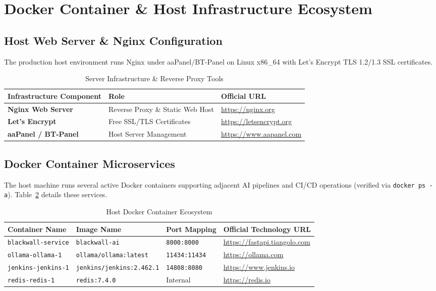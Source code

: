 \documentclass[11pt, a4paper]{article}
\begin{document}
\section{Docker Container \& Host Infrastructure Ecosystem}

\subsection{Host Web Server \& Nginx Configuration}
The production host environment runs Nginx under aaPanel/BT-Panel on Linux x86\_64 with Let's Encrypt TLS 1.2/1.3 SSL certificates.

\begin{table}[H]
\centering
\caption{Server Infrastructure \& Reverse Proxy Tools}
\label{tab:tools_ch7_infra}
\begin{tabularx}{\textwidth}{l l X}
\toprule
\textbf{Infrastructure Component} & \textbf{Role} & \textbf{Official URL} \\
\midrule
\textbf{Nginx Web Server} & Reverse Proxy \& Static Web Host & \url{https://nginx.org} \\
\textbf{Let's Encrypt} & Free SSL/TLS Certificates & \url{https://letsencrypt.org} \\
\textbf{aaPanel / BT-Panel} & Host Server Management & \url{https://www.aapanel.com} \\
\bottomrule
\end{tabularx}
\end{table}

\subsection{Docker Container Microservices}
The host machine runs several active Docker containers supporting adjacent AI pipelines and CI/CD operations (verified via \texttt{docker ps -a}). Table~\ref{tab:docker_containers} details these services.

\begin{table}[H]
\centering
\caption{Host Docker Container Ecosystem}
\label{tab:docker_containers}
\begin{tabularx}{\textwidth}{l l l X}
\toprule
\textbf{Container Name} & \textbf{Image Name} & \textbf{Port Mapping} & \textbf{Official Technology URL} \\
\midrule
\texttt{blackwall-service} & \texttt{blackwall-ai} & \texttt{8000:8000} & \url{https://fastapi.tiangolo.com} \\
\texttt{ollama-ollama-1} & \texttt{ollama/ollama:latest} & \texttt{11434:11434} & \url{https://ollama.com} \\
\texttt{jenkins-jenkins-1} & \texttt{jenkins/jenkins:2.462.1} & \texttt{14808:8080} & \url{https://www.jenkins.io} \\
\texttt{redis-redis-1} & \texttt{redis:7.4.0} & Internal & \url{https://redis.io} \\
\bottomrule
\end{tabularx}
\end{table}
\end{document}
